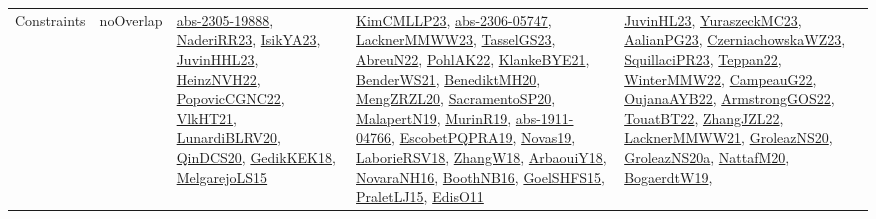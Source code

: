 {\begin{longtable}{lp{3cm}>{\raggedright}p{6cm}>{\raggedright}p{6cm}p{8cm}}
Constraints & noOverlap & \href{articles/abs-2305-19888.pdf}{abs-2305-19888}\cite{abs-2305-19888}, \href{articles/NaderiRR23.pdf}{NaderiRR23}\cite{NaderiRR23}, \href{articles/IsikYA23.pdf}{IsikYA23}\cite{IsikYA23}, \href{papers/JuvinHHL23.pdf}{JuvinHHL23}\cite{JuvinHHL23}, \href{articles/HeinzNVH22.pdf}{HeinzNVH22}\cite{HeinzNVH22}, \href{papers/PopovicCGNC22.pdf}{PopovicCGNC22}\cite{PopovicCGNC22}, \href{articles/VlkHT21.pdf}{VlkHT21}\cite{VlkHT21}, \href{articles/LunardiBLRV20.pdf}{LunardiBLRV20}\cite{LunardiBLRV20}, \href{articles/QinDCS20.pdf}{QinDCS20}\cite{QinDCS20}, \href{articles/GedikKEK18.pdf}{GedikKEK18}\cite{GedikKEK18}, \href{papers/MelgarejoLS15.pdf}{MelgarejoLS15}\cite{MelgarejoLS15} & \href{papers/KimCMLLP23.pdf}{KimCMLLP23}\cite{KimCMLLP23}, \href{articles/abs-2306-05747.pdf}{abs-2306-05747}\cite{abs-2306-05747}, \href{articles/LacknerMMWW23.pdf}{LacknerMMWW23}\cite{LacknerMMWW23}, \href{papers/TasselGS23.pdf}{TasselGS23}\cite{TasselGS23}, \href{articles/AbreuN22.pdf}{AbreuN22}\cite{AbreuN22}, \href{articles/PohlAK22.pdf}{PohlAK22}\cite{PohlAK22}, \href{papers/KlankeBYE21.pdf}{KlankeBYE21}\cite{KlankeBYE21}, \href{papers/BenderWS21.pdf}{BenderWS21}\cite{BenderWS21}, \href{articles/BenediktMH20.pdf}{BenediktMH20}\cite{BenediktMH20}, \href{articles/MengZRZL20.pdf}{MengZRZL20}\cite{MengZRZL20}, \href{articles/SacramentoSP20.pdf}{SacramentoSP20}\cite{SacramentoSP20}, \href{papers/MalapertN19.pdf}{MalapertN19}\cite{MalapertN19}, \href{papers/MurinR19.pdf}{MurinR19}\cite{MurinR19}, \href{articles/abs-1911-04766.pdf}{abs-1911-04766}\cite{abs-1911-04766}, \href{articles/EscobetPQPRA19.pdf}{EscobetPQPRA19}\cite{EscobetPQPRA19}, \href{articles/Novas19.pdf}{Novas19}\cite{Novas19}, \href{articles/LaborieRSV18.pdf}{LaborieRSV18}\cite{LaborieRSV18}, \href{articles/ZhangW18.pdf}{ZhangW18}\cite{ZhangW18}, \href{papers/ArbaouiY18.pdf}{ArbaouiY18}\cite{ArbaouiY18}, \href{articles/NovaraNH16.pdf}{NovaraNH16}\cite{NovaraNH16}, \href{papers/BoothNB16.pdf}{BoothNB16}\cite{BoothNB16}, \href{articles/GoelSHFS15.pdf}{GoelSHFS15}\cite{GoelSHFS15}, \href{papers/PraletLJ15.pdf}{PraletLJ15}\cite{PraletLJ15}, \href{papers/EdisO11.pdf}{EdisO11}\cite{EdisO11} & \href{papers/JuvinHL23.pdf}{JuvinHL23}\cite{JuvinHL23}, \href{papers/YuraszeckMC23.pdf}{YuraszeckMC23}\cite{YuraszeckMC23}, \href{papers/AalianPG23.pdf}{AalianPG23}\cite{AalianPG23}, \href{articles/CzerniachowskaWZ23.pdf}{CzerniachowskaWZ23}\cite{CzerniachowskaWZ23}, \href{papers/SquillaciPR23.pdf}{SquillaciPR23}\cite{SquillaciPR23}, \href{papers/Teppan22.pdf}{Teppan22}\cite{Teppan22}, \href{papers/WinterMMW22.pdf}{WinterMMW22}\cite{WinterMMW22}, \href{articles/CampeauG22.pdf}{CampeauG22}\cite{CampeauG22}, \href{papers/OujanaAYB22.pdf}{OujanaAYB22}\cite{OujanaAYB22}, \href{papers/ArmstrongGOS22.pdf}{ArmstrongGOS22}\cite{ArmstrongGOS22}, \href{papers/TouatBT22.pdf}{TouatBT22}\cite{TouatBT22}, \href{papers/ZhangJZL22.pdf}{ZhangJZL22}\cite{ZhangJZL22}, \href{papers/LacknerMMWW21.pdf}{LacknerMMWW21}\cite{LacknerMMWW21}, \href{papers/GroleazNS20.pdf}{GroleazNS20}\cite{GroleazNS20}, \href{papers/GroleazNS20a.pdf}{GroleazNS20a}\cite{GroleazNS20a}, \href{papers/NattafM20.pdf}{NattafM20}\cite{NattafM20}, \href{papers/BogaerdtW19.pdf}{BogaerdtW19}\cite{BogaerdtW19}, 
\end{longtable}}
